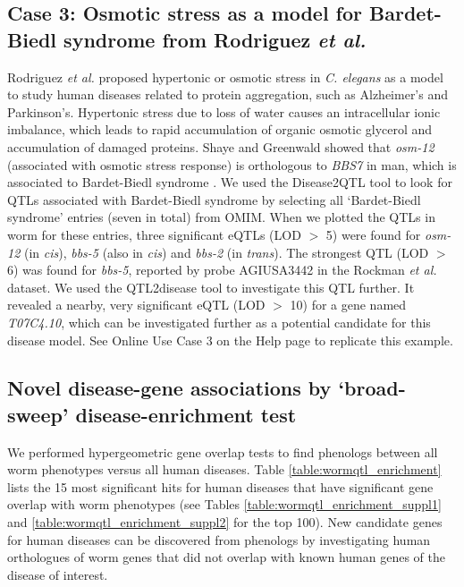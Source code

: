 \subsection[Case 3: Rodriguez \textsl{et al.}]{Case 3: Osmotic stress as a model for Bar\-det-\-Biedl syndrome from Rodriguez \textsl{et al.} \cite{Rodriguez_2013}}
Rodriguez \textsl{et al.} proposed hypertonic or osmotic stress in \textsl{C. elegans} as a model to study human diseases related to protein aggregation, such as Alzheimer’s and Parkinson’s.
Hypertonic stress due to loss of water causes an intracellular ionic imbalance, which leads to rapid accumulation of organic osmotic glycerol and accumulation of damaged proteins.
Shaye and Greenwald \cite{Shaye_2011} showed that \textsl{osm-12} (associated with osmotic stress response) is orthologous to \textsl{BBS7} in man, which is associated to Bardet-Biedl syndrome \cite{Badano_2003}.
We used the Disease2QTL tool to look for QTLs associated with Bardet-Biedl syndrome by selecting all ‘Bardet-Biedl syndrome’ entries (seven in total) from OMIM.
When we plotted the QTLs in worm for these entries, three significant eQTLs (LOD $>$ 5) were found for \textsl{osm-12} (in \textsl{cis}), \textsl{bbs-5} (also in \textsl{cis}) and \textsl{bbs-2} (in \textsl{trans}).
The strongest QTL (LOD $>$ 6) was found for \textsl{bbs-5}, reported by probe AGIUSA3442 in the Rockman \textsl{et al.} dataset.
We used the QTL2disease tool to investigate this QTL further. It revealed a nearby, very significant eQTL (LOD $>$ 10) for a gene named \textsl{T07C4.10}, which can be investigated further as a potential candidate for this disease model.
See Online Use Case 3 on the Help page to replicate this example.

\subsection[Novel disease-gene associations]{Novel disease-gene associations by ‘broad-sweep’ disease-enrichment test}
We performed hypergeometric gene overlap tests to find phenologs between all worm phenotypes versus all human diseases.
Table \ref{table:wormqtl_enrichment} lists the 15 most significant hits for human diseases that have significant gene overlap with worm phenotypes (see Tables \ref{table:wormqtl_enrichment_suppl1} and \ref{table:wormqtl_enrichment_suppl2} for the top 100).
New candidate genes for human diseases can be discovered from phenologs by investigating human orthologues of worm genes that did not overlap with known human genes of the disease of interest.

